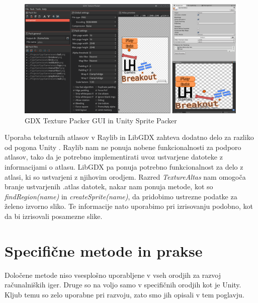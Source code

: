 \documentclass[12pt,a4paper,twoside]{book}
\begin{document}
\begin{figure}[h]
	\centering
	\includegraphics[width=15cm]{texturePacker}
	\caption{GDX Texture Packer GUI in Unity Sprite Packer}
	\label{slika:texturePacker}
\end{figure}
Uporaba teksturnih atlasov v Raylib in LibGDX zahteva dodatno delo za razliko od pogona Unity . Raylib nam ne ponuja nobene funkcionalnosti za podporo atlasov, tako da je potrebno implementirati uvoz ustvarjene datoteke z informacijami o atlasu. LibGDX pa ponuja potrebno funkcionalnost za delo z atlasi, ki so ustvarjeni z njihovim orodjem. Razred \textit{TextureAltas} nam omogoča branje ustvarjenih .atlas datotek, nakar nam ponuja metode, kot so \textit{findRegion(name)} in \textit{createSprite(name)}, da pridobimo ustrezne podatke za želeno izvorno sliko. Te informacije nato uporabimo pri izrisovanju podobno, kot da bi izrisovali posamezne slike. 

\section{Specifične metode in prakse}
Določene metode niso vsesplošno uporabljene v vseh orodjih za razvoj računalniških iger. Druge so na voljo samo v specifičnih orodjih kot je Unity. Kljub temu so zelo uporabne pri razvoju, zato smo jih opisali v tem poglavju.
\end{document}
